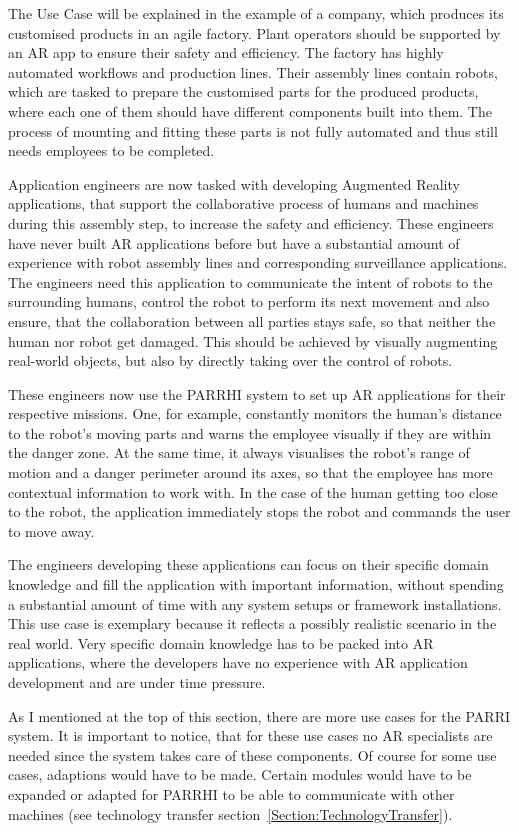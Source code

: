 The Use Case will be explained in the example of a company, which produces its customised products in an agile factory. Plant operators should be supported by an AR app to ensure their safety and efficiency. The factory has highly automated workflows and production lines. Their assembly lines contain robots, which are tasked to prepare the customised parts for the produced products, where each one of them should have different components built into them. The process of mounting and fitting these parts is not fully automated and thus still needs employees to be completed.

Application engineers are now tasked with developing Augmented Reality applications, that support the collaborative process of humans and machines during this assembly step, to increase the safety and efficiency. These engineers have never built AR applications before but have a substantial amount of experience with robot assembly lines and corresponding surveillance applications. The engineers need this application to communicate the intent of robots to the surrounding humans, control the robot to perform its next movement and also ensure, that the collaboration between all parties stays safe, so that neither the human nor robot get damaged. This should be achieved by visually augmenting real-world objects, but also by directly taking over the control of robots.

These engineers now use the PARRHI system to set up AR applications for their respective missions. One, for example, constantly monitors the human's distance to the robot's moving parts and warns the employee visually if they are within the danger zone. At the same time, it always visualises the robot's range of motion and a danger perimeter around its axes, so that the employee has more contextual information to work with. In the case of the human getting too close to the robot, the application immediately stops the robot and commands the user to move away.

The engineers developing these applications can focus on their specific domain knowledge and fill the application with important information, without spending a substantial amount of time with any system setups or framework installations. This use case is exemplary because it reflects a possibly realistic scenario in the real world. Very specific domain knowledge has to be packed into AR applications, where the developers have no experience with AR application development and are under time pressure. 

As I mentioned at the top of this section, there are more use cases for the PARRI system. It is important to notice, that for these use cases no AR specialists are needed since the system takes care of these components. Of course for some use cases, adaptions would have to be made. Certain modules would have to be expanded or adapted for PARRHI to be able to communicate with other machines (see technology transfer section~\ref{Section:TechnologyTransfer}). 

